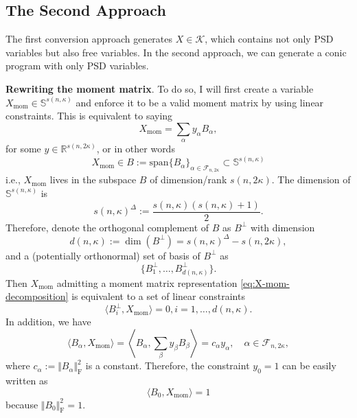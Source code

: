 \documentclass[
]{book}
\theoremstyle{definition}
\theoremstyle{definition}
\theoremstyle{definition}
\theoremstyle{definition}
\theoremstyle{remark}
\begin{document}
\subsection{The Second Approach}\label{SOSConversionSDPSecond}

The first conversion approach generates \(X \in \mathcal{K}\), which contains not only PSD variables but also free variables. In the second approach, we can generate a conic program with only PSD variables.

\textbf{Rewriting the moment matrix}. To do so, I will first create a variable \(X_{\mathrm{mom}} \in \mathbb{S}^{s(n,\kappa)}\) and enforce it to be a valid moment matrix by using linear constraints. This is equivalent to saying
\begin{equation}
X_{\mathrm{mom}} = \sum_{\alpha} y_{\alpha} B_{\alpha},
\label{eq:X-mom-decomposition}
\end{equation}
for some \(y \in \mathbb{R}^{s(n,2\kappa)}\), or in other words
\[
X_{\mathrm{mom}} \in B := \mathrm{span}\{ B_{\alpha} \}_{\alpha \in \mathcal{F}_{n,2\kappa}} \subset \mathbb{S}^{s(n,\kappa)}
\]
i.e., \(X_{\mathrm{mom}}\) lives in the subspace \(B\) of dimension/rank \(s(n,2\kappa)\). The dimension of \(\mathbb{S}^{s(n,\kappa)}\) is
\[
s(n,\kappa)^{\Delta} := \frac{s(n,\kappa) (s(n,\kappa) +1)}{2}.
\]
Therefore, denote the orthogonal complement of \(B\) as \(B^{\perp}\) with dimension
\[
d(n,\kappa) := \dim (B^{\perp}) = s(n,\kappa)^{\Delta} - s(n,2\kappa),
\]
and a (potentially orthonormal) set of basis of \(B^{\perp}\) as
\[
\{ B^{\perp}_{1}, \dots, B^{\perp}_{d(n,\kappa)}  \}.
\]
Then \(X_{\mathrm{mom}}\) admitting a moment matrix representation \eqref{eq:X-mom-decomposition} is equivalent to a set of linear constraints
\begin{equation}
\langle B^{\perp}_{i},  X_{\mathrm{mom}}  \rangle = 0, i=1,\dots, d(n,\kappa).
\label{eq:moment-matrix-valid-constraints}
\end{equation}
In addition, we have
\begin{equation}
\langle B_{\alpha}, X_{\mathrm{mom}} \rangle = \left\langle B_{\alpha}, \sum_{\beta}y_{\beta} B_{\beta}  \right\rangle = c_{\alpha} y_{\alpha}, \quad \alpha \in \mathcal{F}_{n,2\kappa},
\label{eq:from-X-mom-to-y-mom}
\end{equation}
where \(c_{\alpha} := \Vert B_{\alpha} \Vert_\mathrm{F}^2\) is a constant. Therefore, the constraint \(y_0 = 1\) can be easily written as
\begin{equation}
\langle B_0, X_{\mathrm{mom}} \rangle = 1
\label{eq:moment-matrix-one-constraint}
\end{equation}
because \(\Vert B_0 \Vert_\mathrm{F}^2 = 1\).
\end{document}
